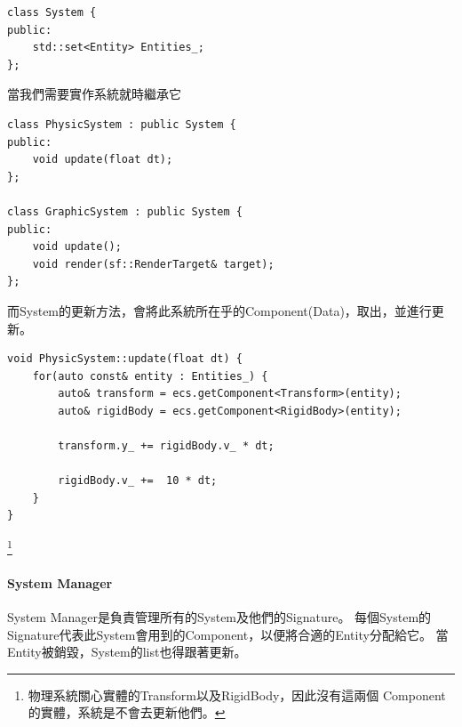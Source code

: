 \begin{lstlisting}
class System {
public:
    std::set<Entity> Entities_;
};
\end{lstlisting}

當我們需要實作系統就時繼承它

\begin{lstlisting}
class PhysicSystem : public System {
public:
    void update(float dt);
};

class GraphicSystem : public System {
public:
    void update();
    void render(sf::RenderTarget& target);
};
\end{lstlisting}

而System的更新方法，會將此系統所在乎的Component(Data)，取出，並進行更新。

\begin{lstlisting}
void PhysicSystem::update(float dt) {
    for(auto const& entity : Entities_) {
        auto& transform = ecs.getComponent<Transform>(entity);
        auto& rigidBody = ecs.getComponent<RigidBody>(entity);

        transform.y_ += rigidBody.v_ * dt;

        rigidBody.v_ +=  10 * dt;
    }
}
\end{lstlisting}

\footnote{物理系統關心實體的Transform以及RigidBody，因此沒有這兩個 Component的實體，系統是不會去更新他們。}

\paragraph{System Manager}

System Manager是負責管理所有的System及他們的Signature。
每個System的Signature代表此System會用到的Component，以便將合適的Entity分配給它。
當Entity被銷毀，System的list也得跟著更新。

